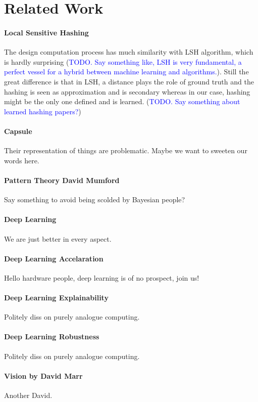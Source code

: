 \documentclass[10pt, oneside]{article}   	%
\theoremstyle{definition}
\begin{document}
\section{Related Work}



\paragraph{Local Sensitive Hashing} The design computation process has much similarity with LSH algorithm, which is hardly surprising (\textcolor{blue}{TODO. Say something like, LSH is very fundamental, a perfect vessel for a hybrid between machine learning and algorithms.}). Still the great difference is that in LSH, a distance plays the role of ground truth and the hashing is seen as approximation and is secondary whereas in our case, hashing might be the only one defined and is learned. (\textcolor{blue}{TODO. Say something about learned hashing papers?})
\paragraph{Capsule} Their representation of things are problematic. Maybe we want to sweeten our words here.
\paragraph{Pattern Theory David Mumford} Say something to avoid being scolded by Bayesian people?
\paragraph{Deep Learning} We are just better in every aspect.
\paragraph{Deep Learning Accelaration} Hello hardware people, deep learning is of no prospect, join us!
\paragraph{Deep Learning Explainability} Politely diss on purely analogue computing.
\paragraph{Deep Learning Robustness} Politely diss on purely analogue computing.
\paragraph{Vision by David Marr} Another David.
\end{document}
